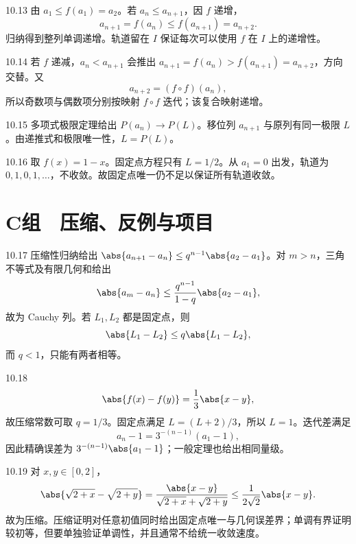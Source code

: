 \begin{solution}{10.13}
由 \(a_1\le f(a_1)=a_2\)。若 \(a_n\le a_{n+1}\)，因 \(f\) 递增，
\[
 a_{n+1}=f(a_n)\le f(a_{n+1})=a_{n+2}.
\]
归纳得到整列单调递增。轨道留在 \(I\) 保证每次可以使用 \(f\) 在 \(I\) 上的递增性。
\end{solution}

\begin{solution}{10.14}
若 \(f\) 递减，\(a_n<a_{n+1}\) 会推出
\(a_{n+1}=f(a_n)>f(a_{n+1})=a_{n+2}\)，方向交替。又
\[
 a_{n+2}=(f\circ f)(a_n),
\]
所以奇数项与偶数项分别按映射 \(f\circ f\) 迭代；该复合映射递增。
\end{solution}

\begin{solution}{10.15}
多项式极限定理给出 \(P(a_n)\to P(L)\)。移位列 \(a_{n+1}\) 与原列有同一极限 \(L\)。由递推式和极限唯一性，\(L=P(L)\)。
\end{solution}

\begin{solution}{10.16}
取 \(f(x)=1-x\)。固定点方程只有 \(L=1/2\)。从 \(a_1=0\) 出发，轨道为
\(0,1,0,1,\ldots\)，不收敛。故固定点唯一仍不足以保证所有轨道收敛。
\end{solution}

\section*{C组　压缩、反例与项目}

\begin{solution}{10.17}
压缩性归纳给出
\(\abs{a_{n+1}-a_n}\le q^{n-1}\abs{a_2-a_1}\)。对 \(m>n\)，三角不等式及有限几何和给出
\[
 \abs{a_m-a_n}
 \le\frac{q^{n-1}}{1-q}\abs{a_2-a_1},
\]
故为 Cauchy 列。若 \(L_1,L_2\) 都是固定点，则
\[
 \abs{L_1-L_2}\le q\abs{L_1-L_2},
\]
而 \(q<1\)，只能有两者相等。
\end{solution}

\begin{solution}{10.18}
\[
 \abs{f(x)-f(y)}=\frac13\abs{x-y},
\]
故压缩常数可取 \(q=1/3\)。固定点满足 \(L=(L+2)/3\)，所以 \(L=1\)。迭代差满足
\[
 a_n-1=3^{-(n-1)}(a_1-1),
\]
因此精确误差为 \(3^{-(n-1)}\abs{a_1-1}\)；一般定理也给出相同量级。
\end{solution}

\begin{solution}{10.19}
对 \(x,y\in[0,2]\)，
\[
 \abs{\sqrt{2+x}-\sqrt{2+y}}
 =\frac{\abs{x-y}}{\sqrt{2+x}+\sqrt{2+y}}
 \le\frac1{2\sqrt2}\abs{x-y}.
\]
故为压缩。压缩证明对任意初值同时给出固定点唯一与几何误差界；单调有界证明较初等，但要单独验证单调性，并且通常不给统一收敛速度。
\end{solution}

